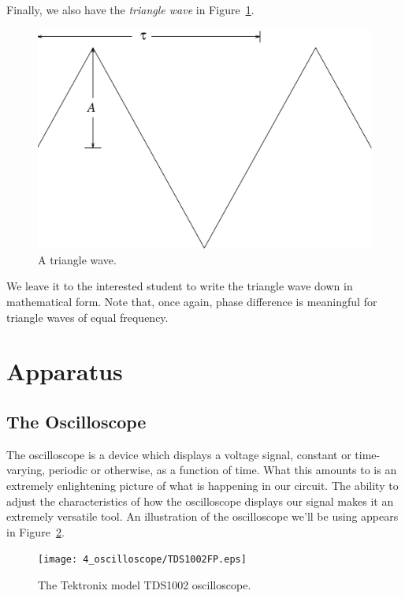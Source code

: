 Finally, we also have the {\it triangle wave} in 
Figure~\ref{fig:scope:triwave}.
\begin{figure}[htb]
\centering \epsfxsize=8cm \includegraphics[scale=0.4]{4_oscilloscope/triwave.eps}
\caption{A triangle wave.}
\label{fig:scope:triwave}
\end{figure}
We leave it to the interested student to write the triangle wave down in 
mathematical form. Note that, once again, phase difference is meaningful for
triangle waves of equal frequency.

\section{Apparatus}

\subsection{The Oscilloscope}

The oscilloscope is a device which displays a voltage signal, constant or 
time-varying, periodic or otherwise, as a function of time.  What this amounts
to is an extremely enlightening picture of what is happening in our circuit.
The ability to adjust the characteristics of how the oscilloscope displays our
signal makes it an extremely versatile tool.  An illustration of the 
oscilloscope we'll be using appears in Figure~\ref{fig:scope:oscope}.
\begin{figure}[htb]
\centering \epsfxsize=16cm \texttt{[image: 4\_oscilloscope/TDS1002FP.eps]}
\caption{The Tektronix model TDS1002 oscilloscope.}
\label{fig:scope:oscope}
\end{figure}

